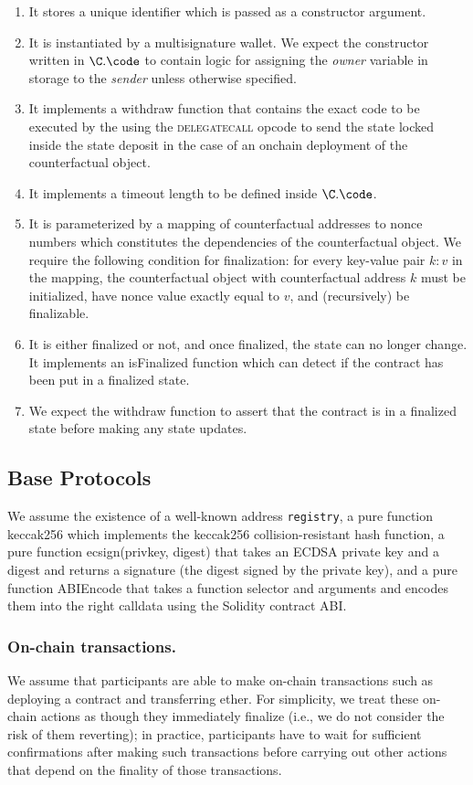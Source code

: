 \documentclass[prb,floatfix,reprint,nofootinbib,amsmath,amssymb,epsfig,pre,floats,letterpaper,groupedaffiliation,tightenlines,allcolors=blue,11pt]{revtex4}
\theoremstyle{definition}
\theoremstyle{definition}
\theoremstyle{definition}
\begin{document}
\begin{enumerate}
\item It stores a unique identifier which is passed as a constructor argument.
\item It is instantiated by a multisignature wallet. We expect the constructor written in $\C.\code$ to contain logic for assigning the \textit{owner} variable in storage to the \textit{sender} unless otherwise specified.
\item It implements a \textsf{withdraw} function that contains the exact code to be executed by the \multisigWS using the \textsc{delegatecall} opcode to send the state locked inside the state deposit in the case of an onchain deployment of the counterfactual object.
\item It implements a timeout length to be defined inside $\C.\code$.
\item It is parameterized by a mapping of counterfactual addresses to nonce numbers which constitutes the dependencies of the counterfactual object. We require the following condition for finalization: for every key-value pair $k: v$ in the mapping, the counterfactual object with counterfactual address $k$ must be initialized, have nonce value exactly equal to $v$, and (recursively) be finalizable.
\item It is either finalized or not, and once finalized, the state can no longer change. It implements an \textsf{isFinalized} function which can detect if the contract has been put in a finalized state.
\item We expect the \textsf{withdraw} function to assert that the contract is in a finalized state before making any state updates.
\end{enumerate}


\subsection{Base Protocols}

We assume the existence of a well-known address \texttt{registry}, a pure function keccak256 which implements the keccak256 collision-resistant hash function, a pure function ecsign(privkey, digest) that takes an ECDSA private key and a digest and returns a signature (the digest signed by the private key), and a pure function ABIEncode that takes a function selector and arguments and encodes them into the right calldata using the Solidity contract ABI.

\subsubsection{On-chain transactions.} We assume that participants are able to make on-chain transactions such as deploying a contract and transferring ether. For simplicity, we treat these on-chain actions as though they immediately finalize (i.e., we do not consider the risk of them reverting); in practice, participants have to wait for sufficient confirmations after making such transactions before carrying out other actions that depend on the finality of those transactions.
\end{document}
